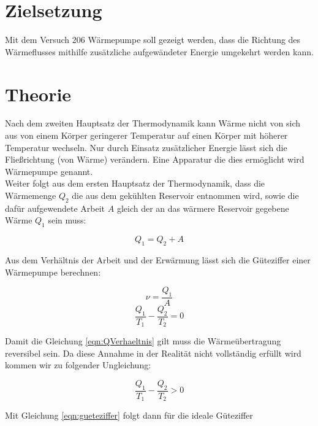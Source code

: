 \section{Zielsetzung}
\label{sec:Zielsetzung}

Mit dem Versuch 206 Wärmepumpe soll gezeigt werden, dass die Richtung des Wärmeflusses mithilfe zusätzliche aufgewändeter
Energie umgekehrt werden kann.


\section{Theorie}
\label{sec:Theorie}
Nach dem zweiten Hauptsatz der Thermodynamik kann Wärme nicht von sich aus von einem Körper geringerer Temperatur auf einen Körper 
mit höherer Temperatur wechseln. Nur durch Einsatz zusätzlicher Energie lässt sich die Fließrichtung (von Wärme) verändern.
Eine Apparatur die dies ermöglicht wird Wärmepumpe genannt.\\
Weiter folgt aus dem ersten Hauptsatz der Thermodynamik, dass die Wärmemenge $Q_2$ die aus dem gekühlten Reservoir entnommen wird,
sowie die dafür aufgewendete Arbeit $A$ gleich der an das wärmere Reservoir gegebene Wärme $Q_1$ sein muss:

\begin{equation}\label{eqn:hauptsatz1}
    Q_1 = Q_2 + A
\end{equation}

Aus dem Verhältnis der Arbeit und der Erwärmung lässt sich die Güteziffer einer Wärmepumpe berechnen:

\begin{equation}\label{eqn:gueteziffer}
    ν = \frac{Q_1}{A}
\end{equation}
\begin{equation}\label{eqn:QVerhaeltnis}
    \frac{Q_1}{T_1} - \frac{Q_2}{T_2} = 0
\end{equation}

Damit die Gleichung \eqref{eqn:QVerhaeltnis} gilt muss die Wärmeübertragung reversibel sein. 
Da diese Annahme in der Realität nicht vollständig erfüllt wird kommen wir zu folgender Ungleichung:

\begin{equation}
    \frac{Q_1}{T_1} - \frac{Q_2}{T_2} > 0
\end{equation}

Mit Gleichung \eqref{eqn:gueteziffer} folgt dann für die ideale Güteziffer 

